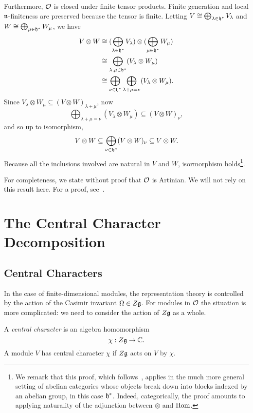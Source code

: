 \documentclass[11pt]{article}
\begin{document}
Furthermore, $\mathcal{O}$ is closed under finite tensor products. Finite generation and
local $\mathfrak{n}$-finiteness are preserved because the tensor is finite. Letting $V
	\cong \bigoplus_{\lambda\in\mathfrak{h}^*}V_\lambda$ and $W \cong
	\bigoplus_{\mu\in\mathfrak{h}^*}W_\mu$, we have
\begin{align*}
	V\otimes W & \cong (\bigoplus_{\lambda\in\mathfrak{h}^*}
	V_\lambda)\otimes(\bigoplus_{\mu\in\mathfrak{h}^*} W_\mu)                                                     \\
	           & \cong \bigoplus_{\lambda,\mu\in\mathfrak{h}^*}(V_\lambda\otimes W_\mu)                           \\
	           & \cong \bigoplus_{\nu\in\mathfrak{h}^*}\bigoplus_{\lambda + \mu = \nu} (V_\lambda \otimes W_\mu).
\end{align*}
Since $V_\lambda\otimes W_\mu\subseteq (V\otimes W)_{\lambda + \mu}$, now \[
	\bigoplus_{\lambda + \mu = \nu} (V_\lambda \otimes W_\mu) \subseteq (V\otimes W)_\nu,
\]and so up to isomorphism, \[
	V\otimes W\subseteq \bigoplus_{\nu\in\mathfrak{h}^*} (V\otimes W)_\nu\subseteq V\otimes
	W.
\]Because all the inclusions involved are natural in $V$ and $W$, isormorphism
holds\footnote{
	We remark that this proof, which follows~\cite[Lemma 19.1(ii)]{carter},
	applies in the much more general setting of abelian categories whose objects
	break down into blocks indexed by an abelian group, in this case $\mathfrak{h}^*$.
	Indeed, categorically, the proof amounts to applying naturality of the
	adjunction between $\otimes$ and $\operatorname{Hom}$.
}.

For completeness, we state without proof that $\mathcal{O}$ is Artinian. We will not
rely on this result here. For a proof, see~\cite[Section 1.11]{humphreys}.

\section{The Central Character Decomposition}
\label{sec:decomposition}

\subsection{Central Characters}

In the case of finite-dimensional modules, the representation theory is
controlled by the action of the Casimir invariant $\Omega\in Z\mathfrak{g}$. For
modules in $\mathcal{O}$ the situation is more complicated: we need to consider the
action of $Z\mathfrak{g}$ as a whole.

\begin{dfn}\label{def:central character}
	A \emph{central character} is an algebra homomorphism \[
		\chi: Z\mathfrak{g}\rightarrow\mathbb{C}.
	\]
	A module $V$ has central character $\chi$ if $Z\mathfrak{g}$ acts on $V$ by $\chi$.
\end{dfn}
\end{document}
